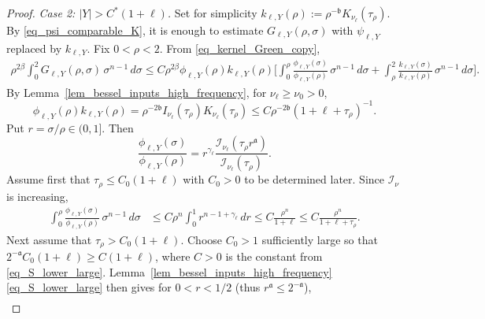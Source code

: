 \documentclass[12pt]{amsart}
\begin{document}
\begin{proof}
\textit{Case 2: $|Y|> C^*(1+\ell)$.} Set for simplicity $k_{\ell,Y}(\rho):=\rho^{-\mathfrak b}K_{\nu_\ell}(\tau_\rho)$. 
By \eqref{eq_psi_comparable_K}, it is enough to estimate $G_{\ell,Y}(\rho,\sigma)$ with $\psi_{\ell,Y}$ replaced by $k_{\ell,Y}$. Fix $0<\rho<2$. From \eqref{eq_kernel_Green_copy},
\begin{align}\label{eq_weighted_split}
    \rho^{2\beta}
    \int_0^2
        G_{\ell,Y}(\rho,\sigma)
    \, \sigma^{n-1} \, d\sigma                                      \nonumber
    \le
    C\rho^{2\beta}
    \phi_{\ell,Y}(\rho)k_{\ell,Y}(\rho)
    \biggl[\int_0^\rho \frac{\phi_{\ell,Y}(\sigma)}{\phi_{\ell,Y}(\rho)} \, \sigma^{n-1} \, d\sigma + \int_\rho^2 \frac{k_{\ell,Y}(\sigma)}{k_{\ell,Y}(\rho)} \, \sigma^{n-1} \, d\sigma \biggr].
\end{align}
By Lemma~\ref{lem_bessel_inputs_high_frequency}, for $\nu_\ell\ge \nu_0>0$,
\begin{equation}\label{eq_phi_k_product}
    \phi_{\ell,Y}(\rho)k_{\ell,Y}(\rho)
    =
    \rho^{-2\mathfrak b}
    I_{\nu_\ell}(\tau_\rho)K_{\nu_\ell}(\tau_\rho)
    \le
    C\rho^{-2\mathfrak b}(1 + \ell + \tau_\rho)^{-1}.
\end{equation}
Put $r=\sigma/\rho\in(0,1]$. Then
\begin{equation*}
\frac{\phi_{\ell,Y}(\sigma)}{\phi_{\ell,Y}(\rho)} = r^{\gamma_\ell} \frac{\mathcal I_{\nu_\ell}(\tau_\rho r^{\mathfrak a})}{\mathcal I_{\nu_\ell}(\tau_\rho)}.
\end{equation*}
Assume first that $\tau_\rho \le  C_0(1+\ell)$ with $C_0>0$ to be determined later. Since $\mathcal I_\nu$ is increasing,
\begin{align*}
    \int_0^\rho
        \frac{\phi_{\ell,Y}(\sigma)}
             {\phi_{\ell,Y}(\rho)}
    \, \sigma^{n-1} \, d\sigma
    &\le C\rho^n \int_0^1 r^{n-1+\gamma_\ell}\,dr
    \le C\frac{\rho^n}{1+\ell}
    \le C\frac{\rho^n}{1+ \ell + \tau_\rho}.
\end{align*}
Next assume that $\tau_\rho>C_0(1+\ell)$. Choose $C_0>1$ sufficiently large so that $2^{- \mathfrak a} C_0 (1+\ell) \ge C(1+\ell)$, where $C>0$ is the constant from \eqref{eq_S_lower_large}. Lemma~\ref{lem_bessel_inputs_high_frequency} \eqref{eq_S_lower_large} then gives for $0<r<1/2$ (thus $r^{\mathfrak a}\le 2^{- \mathfrak a}$),
\begin{align*}

\end{align*}
\end{proof}
\end{document}
